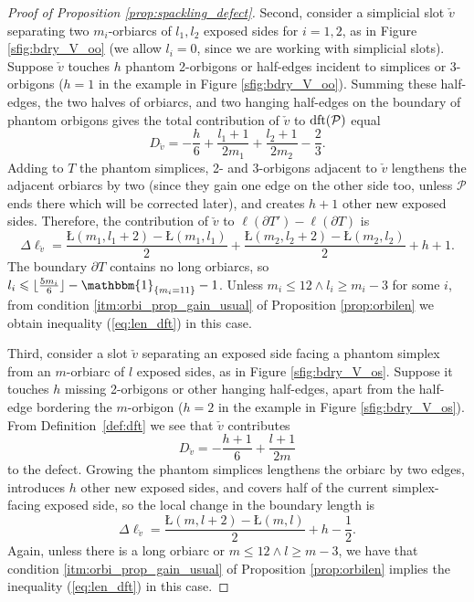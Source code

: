 \documentclass{amsart}
\newcommand{\dft}{\textnormal{dft}}
\begin{document}
\begin{proof}[Proof of Proposition \ref{prop:spackling_defect}]
Second, consider a simplicial slot $\check{v}$ separating two $m_i$-orbiarcs of $l_1,l_2$ exposed sides for $i=1,2$, as in Figure \ref{sfig:bdry_V_oo} (we allow $l_i=0$, since we are working with simplicial slots). Suppose $\check{v}$ touches $h$ phantom 2-orbigons or half-edges incident to simplices or 3-orbigons ($h=1$ in the example in Figure \ref{sfig:bdry_V_oo}). Summing these half-edges, the two halves of orbiarcs, and two hanging half-edges on the boundary of phantom orbigons gives the total contribution of $\check{v}$ to $\dft(\mathcal{P})$ equal
\begin{equation*}
D_{\check{v}}=-\frac{h}{6}+\frac{l_1+1}{2m_1}+\frac{l_2+1}{2m_2}-\frac{2}{3}.
\end{equation*}
Adding to $T$ the phantom simplices, 2- and 3-orbigons adjacent to $\check{v}$ lengthens the adjacent orbiarcs by two (since they gain one edge on the other side too, unless $\mathcal{P}$ ends there which will be corrected later), and creates $h+1$ other new exposed sides. Therefore, the contribution of $\check{v}$ to $\ell(\partial T')-\ell(\partial T)$ is
\begin{equation*}
\Delta\ell_{\check{v}}=\frac{Ł(m_1,l_1+2)-Ł(m_1,l_1)}{2}+\frac{Ł(m_2,l_2+2)-Ł(m_2,l_2)}{2}+h+1.
\end{equation*}
The boundary $\partial T$ contains no long orbiarcs, so $l_i\leqslant\lfloor\tfrac{5m_i}{6}\rfloor-\mathbbm{1}_{\{m_i=11\}}-1$. Unless $m_i\leqslant12\wedge l_i\geqslant m_i-3$ for some $i$, from condition \ref*{itm:orbi_prop_gain_usual} of Proposition \ref{prop:orbilen} we obtain inequality (\ref{eq:len_dft}) in this case.

Third, consider a slot $\check{v}$ separating an exposed side facing a phantom simplex from an $m$-orbiarc of $l$ exposed sides, as in Figure \ref{sfig:bdry_V_os}. Suppose it touches $h$ missing 2-orbigons or other hanging half-edges, apart from the half-edge bordering the $m$-orbigon ($h=2$ in the example in Figure \ref{sfig:bdry_V_os}). From Definition~\ref{def:dft} we see that $\check{v}$ contributes
\begin{equation}\label{eq:dft_contrib_oa_spx}
D_{\check{v}}=-\frac{h+1}{6}+\frac{l+1}{2m}
\end{equation}
to the defect. Growing the phantom simplices lengthens the orbiarc by two edges, introduces $h$ other new exposed sides, and covers half of the current simplex-facing exposed side, so the local change in the boundary length is
\begin{equation*}
\Delta\ell_{\check{v}}=\frac{Ł(m,l+2)-Ł(m,l)}{2}+h-\frac{1}{2}.
\end{equation*}
Again, unless there is a long orbiarc or $m\leqslant12\wedge l\geqslant m-3$, we have that condition \ref*{itm:orbi_prop_gain_usual} of Proposition \ref{prop:orbilen} implies the inequality (\ref{eq:len_dft}) in this case.


\end{proof}
\end{document}
